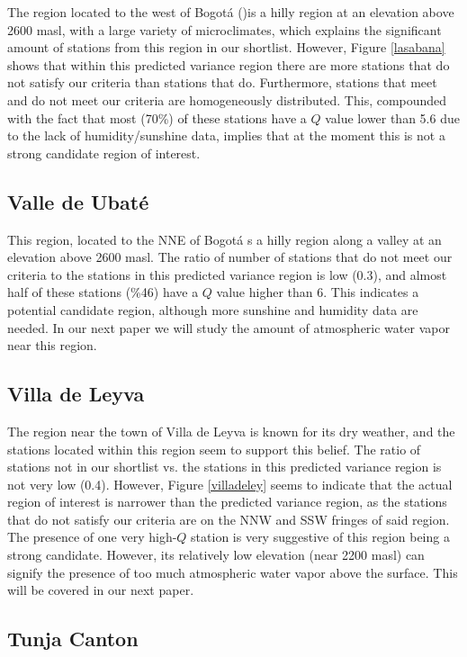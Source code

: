 \documentclass[12pt]{iopart}
\begin{document}
The region located to the west of Bogot\'a ()is a hilly region at an elevation above 2600 masl, with a large variety of microclimates, which explains the significant amount of stations from this region in our shortlist. However, Figure \ref{lasabana} shows that within this predicted variance region there are more stations that do not satisfy our criteria than stations that do. Furthermore, stations that meet and do not meet our criteria are homogeneously distributed. This, compounded with the fact that most (70\%) of these stations have a $Q$ value lower than 5.6 due to the lack of humidity/sunshine data, implies that at the moment this is not a strong candidate region of interest.
\subsection{Valle de Ubat\'e}

This region, located to the NNE of Bogot\'a s a hilly region along a valley at an elevation above 2600 masl. The ratio of number of stations that do not meet our criteria to the stations in this predicted variance region is low (0.3), and almost half of these stations (\%46) have a $Q$ value higher than 6. This indicates a potential candidate region, although more  sunshine and humidity data are needed. In our next paper we will study the amount of atmospheric water vapor near this region.

\subsection{Villa de Leyva}

The region near the town of Villa de Leyva is known for its dry weather, and the stations located within this region seem to support this belief. The ratio of stations not in our shortlist vs. the stations in this predicted variance region is not very low (0.4). However, Figure \ref{villadeley} seems to indicate that the actual region of interest is narrower than the predicted variance region, as the stations that do not satisfy our criteria are on the NNW and SSW fringes of said region. The presence of one very high-$Q$ station is very suggestive of this region being a strong candidate. However, its relatively low elevation (near 2200 masl) can signify the presence of too much atmospheric water vapor above the surface. This will be covered in our next paper.

\subsection{Tunja Canton}
\end{document}

